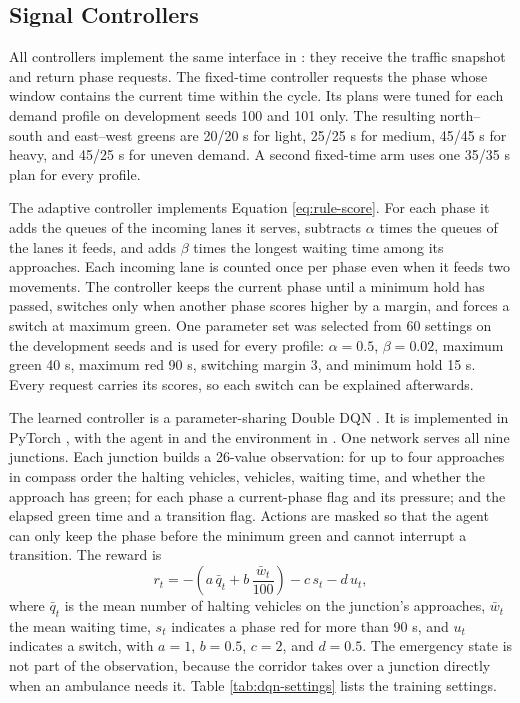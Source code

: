 \subsection{Signal Controllers}

All controllers implement the same interface in : they receive the traffic snapshot and return phase requests. The fixed-time controller requests the phase whose window contains the current time within the cycle. Its plans were tuned for each demand profile on development seeds 100 and 101 only. The resulting north--south and east--west greens are 20/20 s for light, 25/25 s for medium, 45/45 s for heavy, and 45/25 s for uneven demand. A second fixed-time arm uses one 35/35 s plan for every profile.

The adaptive controller implements Equation \ref{eq:rule-score}. For each phase it adds the queues of the incoming lanes it serves, subtracts $\alpha$ times the queues of the lanes it feeds, and adds $\beta$ times the longest waiting time among its approaches. Each incoming lane is counted once per phase even when it feeds two movements. The controller keeps the current phase until a minimum hold has passed, switches only when another phase scores higher by a margin, and forces a switch at maximum green. One parameter set was selected from 60 settings on the development seeds and is used for every profile: $\alpha=0.5$, $\beta=0.02$, maximum green 40 s, maximum red 90 s, switching margin 3, and minimum hold 15 s. Every request carries its scores, so each switch can be explained afterwards.

The learned controller is a parameter-sharing Double DQN \cite{vanhasselt2016double}. It is implemented in PyTorch \cite{paszke2019pytorch}, with the agent in  and the environment in . One network serves all nine junctions. Each junction builds a 26-value observation: for up to four approaches in compass order the halting vehicles, vehicles, waiting time, and whether the approach has green; for each phase a current-phase flag and its pressure; and the elapsed green time and a transition flag. Actions are masked so that the agent can only keep the phase before the minimum green and cannot interrupt a transition. The reward is
\begin{equation}
r_t = -\left(a\,\bar{q}_t + b\,\frac{\bar{w}_t}{100}\right) - c\,s_t - d\,u_t,
\label{eq:implemented-reward}
\end{equation}
where $\bar{q}_t$ is the mean number of halting vehicles on the junction's approaches, $\bar{w}_t$ the mean waiting time, $s_t$ indicates a phase red for more than 90 s, and $u_t$ indicates a switch, with $a=1$, $b=0.5$, $c=2$, and $d=0.5$. The emergency state is not part of the observation, because the corridor takes over a junction directly when an ambulance needs it. Table \ref{tab:dqn-settings} lists the training settings.

